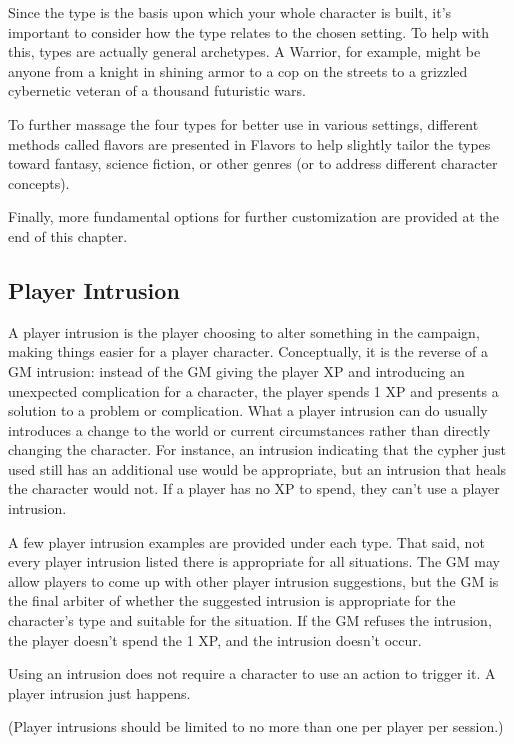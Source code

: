 \begin{multicols}{2}
Since the type is the basis upon which your whole character is built, it’s important to consider how the type relates to the chosen setting. To help with this, types are actually general archetypes. A Warrior, for example, might be anyone from a knight in shining armor to a cop on the streets to a grizzled cybernetic veteran of a thousand futuristic wars. 

To further massage the four types for better use in various settings, different methods called flavors are presented in Flavors to help slightly tailor the types toward fantasy, science fiction, or other genres (or to address different character concepts).

Finally, more fundamental options for further customization are provided at the end of this chapter.

\subsection{Player Intrusion}

A player intrusion is the player choosing to alter something in the campaign, making things easier for a player character. Conceptually, it is the reverse of a GM intrusion: instead of the GM giving the player XP and introducing an unexpected complication for a character, the player spends 1 XP and presents a solution to a problem or complication. What a player intrusion can do usually introduces a change to the world or current circumstances rather than directly changing the character. For instance, an intrusion indicating that the cypher just used still has an additional use would be appropriate, but an intrusion that heals the character would not. If a player has no XP to spend, they can’t use a player intrusion.

A few player intrusion examples are provided under each type. That said, not every player intrusion listed there is appropriate for all situations. The GM may allow players to come up with other player intrusion suggestions, but the GM is the final arbiter of whether the suggested intrusion is appropriate for the character’s type and suitable for the situation. If the GM refuses the intrusion, the player doesn’t spend the 1 XP, and the intrusion doesn’t occur.

Using an intrusion does not require a character to use an action to trigger it. A player intrusion just happens.

(Player intrusions should be limited to no more than one per player per session.)


\end{multicols}
